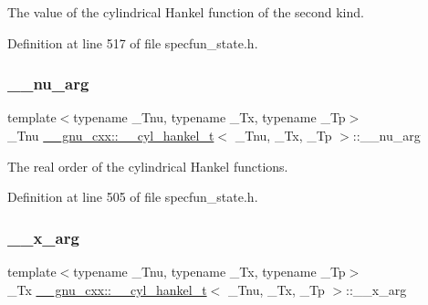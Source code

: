 The value of the cylindrical Hankel function of the second kind. 



Definition at line 517 of file specfun\+\_\+state.\+h.

\mbox{\label{struct____gnu__cxx_1_1____cyl__hankel__t_a67499e047360bcfc7c84f0e3c1d36dab}} 
\subsubsection{\texorpdfstring{\+\_\+\+\_\+nu\+\_\+arg}{\_\_nu\_arg}}
{\footnotesize\ttfamily template$<$typename \+\_\+\+Tnu, typename \+\_\+\+Tx, typename \+\_\+\+Tp$>$ \\
\+\_\+\+Tnu \hyperlink{struct____gnu__cxx_1_1____cyl__hankel__t}{\+\_\+\+\_\+gnu\+\_\+cxx\+::\+\_\+\+\_\+cyl\+\_\+hankel\+\_\+t}$<$ \+\_\+\+Tnu, \+\_\+\+Tx, \+\_\+\+Tp $>$\+::\+\_\+\+\_\+nu\+\_\+arg}



The real order of the cylindrical Hankel functions. 



Definition at line 505 of file specfun\+\_\+state.\+h.

\mbox{\label{struct____gnu__cxx_1_1____cyl__hankel__t_a7b1009ea94ea381fcae13abc9da8b9c6}} 
\subsubsection{\texorpdfstring{\+\_\+\+\_\+x\+\_\+arg}{\_\_x\_arg}}
{\footnotesize\ttfamily template$<$typename \+\_\+\+Tnu, typename \+\_\+\+Tx, typename \+\_\+\+Tp$>$ \\
\+\_\+\+Tx \hyperlink{struct____gnu__cxx_1_1____cyl__hankel__t}{\+\_\+\+\_\+gnu\+\_\+cxx\+::\+\_\+\+\_\+cyl\+\_\+hankel\+\_\+t}$<$ \+\_\+\+Tnu, \+\_\+\+Tx, \+\_\+\+Tp $>$\+::\+\_\+\+\_\+x\+\_\+arg}



